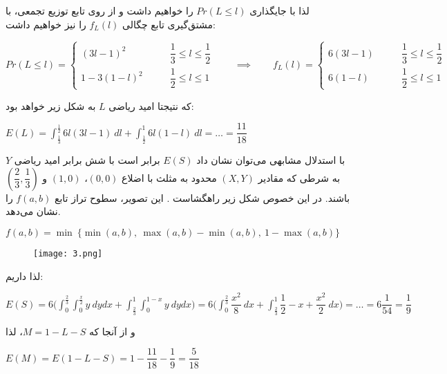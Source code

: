 \documentclass{scribe-cgenomics}
\begin{document}
\begin{حل}
لذا با جایگذاری 
$Pr(L\leq l)$
را خواهیم داشت و از روی تابع توزیع تجمعی، با مشتق‌گیری تابع چگالی
$f_L(l)$
را نیز خواهیم داشت:

\begin{center}
$
Pr(L\leq l) = 
\begin{cases}
(3l-1)^2 &
\qquad \dfrac{1}{3} \leq l \leq \dfrac{1}{2}\\
1 - 3(1-l)^2 &
\qquad \dfrac{1}{2} \leq l \leq 1
\end{cases}
\qquad \implies \qquad
f_L(l) = 
\begin{cases}
6(3l-1) &
\qquad \dfrac{1}{3} \leq l \leq \dfrac{1}{2}\\
6(1-l) &
\qquad \dfrac{1}{2} \leq l \leq 1
\end{cases}
$
\end{center}

که نتیجتا امید ریاضی
$L$
به شکل زیر خواهد بود:

\begin{center}
$
E(L) = 
\int_{\frac{1}{3}}^{\frac{1}{2}} 6l(3l-1)\ dl +
\int_{\frac{1}{2}}^{1} 6l(1-l)\ dl
= \dots = \dfrac{11}{18}
$
\end{center}

با استدلال مشابهی می‌توان نشان داد
$E(S)$
برابر است با شش برابر امید ریاضی
$Y$
به شرطی که مقادیر
$(X,Y)$
محدود به مثلث با اضلاع
$(0,0)$،
$(1,0)$
و
$(\dfrac{2}{3}, \dfrac{1}{3})$
باشند. در این خصوص شکل زیر راهگشاست
\cite{stick_countor}.
این تصویر، سطوح تراز تابع
$f(a,b)$
را نشان می‌دهد.

\begin{center}
$f(a,b) = \min \ \{ \min (a,b),\ \max (a,b)-\min (a,b),\ 1-\max (a,b) \}$
\end{center}

\begin{figure}[h]
\texttt{[image: 3.png]}
\centering
\end{figure}

لذا داریم:

\begin{center}
$
E(S)
= 6\Big( \int_{0}^{\frac{2}{3}} \int_{0}^{\frac{x}{2}} y\ dydx +\int_{\frac{2}{3}}^{1} \int_{0}^{1-x} y\ dydx  \Big)
=6\Big( \int_{0}^{\frac{2}{3}} \dfrac{x^2}{8}\ dx  + \int_{\frac{2}{3}}^{1} \dfrac{1}{2} - x + \dfrac{x^2}{2}\ dx\Big)
= \dots = 6\dfrac{1}{54} = \dfrac{1}{9}
$
\end{center}

و از آنجا که
$M = 1-L-S$،
لذا

\begin{center}
$E(M) = E(1-L-S) = 1-\dfrac{11}{18} - \dfrac{1}{9} = \dfrac{5}{18} $
\end{center}


\end{حل}
\end{document}
